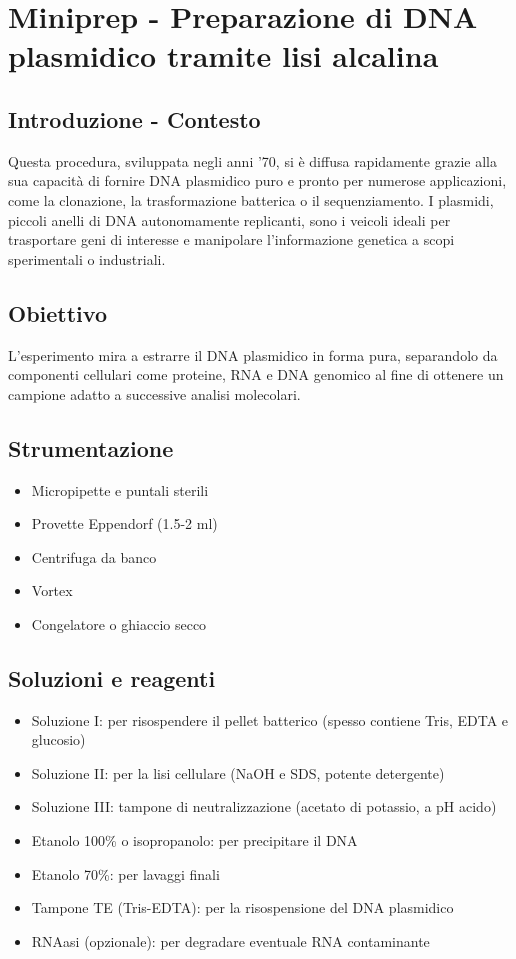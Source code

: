 \section {Miniprep - Preparazione di DNA plasmidico tramite lisi alcalina}

\subsection{Introduzione - Contesto}
Questa procedura, sviluppata negli anni ’70, si è diffusa rapidamente grazie alla sua capacità di fornire DNA plasmidico puro e pronto per numerose applicazioni, come la clonazione, la trasformazione batterica o il sequenziamento. I plasmidi, piccoli anelli di DNA autonomamente replicanti, sono i veicoli ideali per trasportare geni di interesse e manipolare l’informazione genetica a scopi sperimentali o industriali.

\subsection{Obiettivo}
L’esperimento mira a estrarre il DNA plasmidico in forma pura, separandolo da componenti cellulari come proteine, RNA e DNA genomico al fine di ottenere un campione adatto a successive analisi molecolari.

\subsection{Strumentazione}
\begin{itemize}
	\item Micropipette e puntali sterili
	\item Provette Eppendorf (1.5-2 ml)
	\item Centrifuga da banco
	\item Vortex
	\item Congelatore o ghiaccio secco
\end{itemize}

\subsection{Soluzioni e reagenti}
\begin{itemize}
	\item {Soluzione I}: per risospendere il pellet batterico (spesso contiene Tris, EDTA e glucosio)
	\item {Soluzione II}: per la lisi cellulare (NaOH e SDS, potente detergente)
	\item {Soluzione III}: tampone di neutralizzazione (acetato di potassio, a pH acido)
	\item {Etanolo 100\% o isopropanolo}: per precipitare il DNA
	\item {Etanolo 70\%}: per lavaggi finali
	\item {Tampone TE (Tris-EDTA)}: per la risospensione del DNA plasmidico
	\item {RNAasi (opzionale)}: per degradare eventuale RNA contaminante
\end{itemize}

